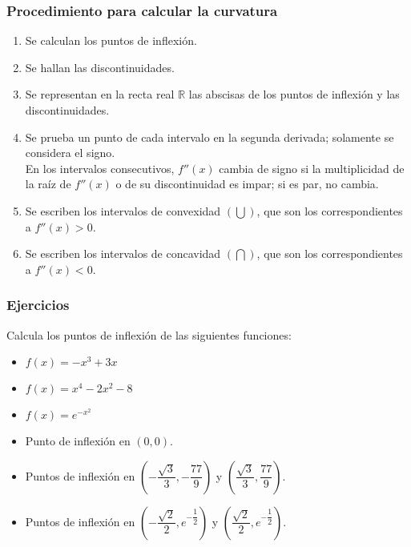 \subsubsection{Procedimiento para calcular la curvatura}
\begin{enumerate}
	\item Se calculan los puntos de inflexión.
	\item Se hallan las discontinuidades.
	\item Se representan en la recta real $\mathbb{R}$ las abscisas de los puntos de inflexión y las discontinuidades.
	\item Se prueba un punto de cada intervalo en la segunda derivada; solamente se considera el signo.\\
	En los intervalos consecutivos, $f''(x)$ cambia de signo si la multiplicidad de la raíz de $f''(x)$ o de su discontinuidad es impar; si es par, no cambia.
	\item Se escriben los intervalos de convexidad $(\bigcup)$, que son los correspondientes a $f''(x) > 0$.
	\item Se escriben los intervalos de concavidad $(\bigcap)$, que son los correspondientes a $f''(x) < 0$.
\end{enumerate}
\subsubsection{Ejercicios}
\begin{ex}
	Calcula los puntos de inflexión de las siguientes funciones:\\
	\begin{itemize}
		\item $f(x)=-x^3+3x$
		\item $f(x)=x^4-2x^2-8$
		\item $f(x)=e^{-x^2}$
	\end{itemize}
	\begin{sol}
		\begin{itemize}
			\item Punto de inflexión en $(0,0)$.
			\item Puntos de inflexión en $(-\dfrac{\sqrt{3}}{3},-\dfrac{77}{9})$ y $(\dfrac{\sqrt{3}}{3},\dfrac{77}{9})$.
			\item Puntos de inflexión en $(-\dfrac{\sqrt{2}}{2},e^{-\dfrac{1}{2}})$ y $(\dfrac{\sqrt{2}}{2},e^{-\dfrac{1}{2}})$.
		\end{itemize}
	\end{sol}
\end{ex}



